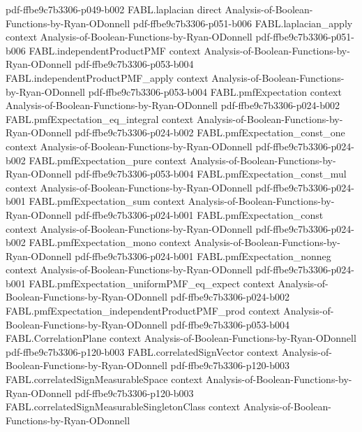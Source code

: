 \begin{theorem}
  {pdf-ffbe9c7b3306-p049-b002}
\proofstep
  {FABL.laplacian}
  {direct}
  {Analysis-of-Boolean-Functions-by-Ryan-ODonnell}
  {pdf-ffbe9c7b3306-p051-b006}
\proofstep
  {FABL.laplacian_apply}
  {context}
  {Analysis-of-Boolean-Functions-by-Ryan-ODonnell}
  {pdf-ffbe9c7b3306-p051-b006}
\proofstep
  {FABL.independentProductPMF}
  {context}
  {Analysis-of-Boolean-Functions-by-Ryan-ODonnell}
  {pdf-ffbe9c7b3306-p053-b004}
\proofstep
  {FABL.independentProductPMF_apply}
  {context}
  {Analysis-of-Boolean-Functions-by-Ryan-ODonnell}
  {pdf-ffbe9c7b3306-p053-b004}
\proofstep
  {FABL.pmfExpectation}
  {context}
  {Analysis-of-Boolean-Functions-by-Ryan-ODonnell}
  {pdf-ffbe9c7b3306-p024-b002}
\proofstep
  {FABL.pmfExpectation_eq_integral}
  {context}
  {Analysis-of-Boolean-Functions-by-Ryan-ODonnell}
  {pdf-ffbe9c7b3306-p024-b002}
\proofstep
  {FABL.pmfExpectation_const_one}
  {context}
  {Analysis-of-Boolean-Functions-by-Ryan-ODonnell}
  {pdf-ffbe9c7b3306-p024-b002}
\proofstep
  {FABL.pmfExpectation_pure}
  {context}
  {Analysis-of-Boolean-Functions-by-Ryan-ODonnell}
  {pdf-ffbe9c7b3306-p053-b004}
\proofstep
  {FABL.pmfExpectation_const_mul}
  {context}
  {Analysis-of-Boolean-Functions-by-Ryan-ODonnell}
  {pdf-ffbe9c7b3306-p024-b001}
\proofstep
  {FABL.pmfExpectation_sum}
  {context}
  {Analysis-of-Boolean-Functions-by-Ryan-ODonnell}
  {pdf-ffbe9c7b3306-p024-b001}
\proofstep
  {FABL.pmfExpectation_const}
  {context}
  {Analysis-of-Boolean-Functions-by-Ryan-ODonnell}
  {pdf-ffbe9c7b3306-p024-b002}
\proofstep
  {FABL.pmfExpectation_mono}
  {context}
  {Analysis-of-Boolean-Functions-by-Ryan-ODonnell}
  {pdf-ffbe9c7b3306-p024-b001}
\proofstep
  {FABL.pmfExpectation_nonneg}
  {context}
  {Analysis-of-Boolean-Functions-by-Ryan-ODonnell}
  {pdf-ffbe9c7b3306-p024-b001}
\proofstep
  {FABL.pmfExpectation_uniformPMF_eq_expect}
  {context}
  {Analysis-of-Boolean-Functions-by-Ryan-ODonnell}
  {pdf-ffbe9c7b3306-p024-b002}
\proofstep
  {FABL.pmfExpectation_independentProductPMF_prod}
  {context}
  {Analysis-of-Boolean-Functions-by-Ryan-ODonnell}
  {pdf-ffbe9c7b3306-p053-b004}
\proofstep
  {FABL.CorrelationPlane}
  {context}
  {Analysis-of-Boolean-Functions-by-Ryan-ODonnell}
  {pdf-ffbe9c7b3306-p120-b003}
\proofstep
  {FABL.correlatedSignVector}
  {context}
  {Analysis-of-Boolean-Functions-by-Ryan-ODonnell}
  {pdf-ffbe9c7b3306-p120-b003}
\proofstep
  {FABL.correlatedSignMeasurableSpace}
  {context}
  {Analysis-of-Boolean-Functions-by-Ryan-ODonnell}
  {pdf-ffbe9c7b3306-p120-b003}
\proofstep
  {FABL.correlatedSignMeasurableSingletonClass}
  {context}
  {Analysis-of-Boolean-Functions-by-Ryan-ODonnell}

\end{theorem}
